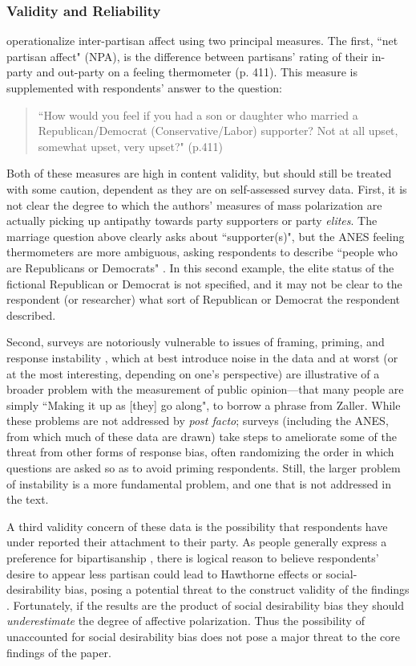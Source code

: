 \documentclass[12pt]{article}
\begin{document}
\subsubsection{Validity and Reliability}
\citeauthor{iyengar2012affect} operationalize inter-partisan affect using two principal measures. The first, ``net partisan affect" (NPA), is the difference between partisans' rating of their in-party and out-party on a feeling thermometer (p. 411). This measure is supplemented with respondents' answer to the question: 
\begin{quote}
``How would you feel if you had a son or daughter who married a Republican/Democrat (Conservative/Labor) supporter? Not at all upset, somewhat upset, very upset?" (p.411)
\end{quote}
Both of these measures are high in content validity, but should still be treated with some caution, dependent as they are on self-assessed survey data. First, it is not clear the degree to which the authors' measures of mass polarization are actually picking up antipathy towards party supporters or party \textit{elites}. The marriage question above clearly asks about ``supporter(s)", but the ANES feeling thermometers are more ambiguous, asking respondents to describe ``people who are Republicans or Democrats" \citep[p. 412]{iyengar2012affect}. In this second example, the elite status of the fictional Republican or Democrat is not specified, and it may not be clear to the respondent (or researcher) what sort of Republican or Democrat the respondent described.

Second, surveys are notoriously vulnerable to issues of framing, priming, and response instability \citep[p. 53--75]{zaller1992nature}, which at best introduce noise in the data and at worst (or at the most interesting, depending on one's perspective) are illustrative of a broader problem with the measurement of public opinion---that many people are simply ``Making it up as [they] go along", to borrow a phrase from Zaller. While these problems are not addressed by \citeauthor{iyengar2012affect} \textit{post facto}; surveys (including the ANES, from which much of these data are drawn) take steps to ameliorate some of the threat from other forms of response bias, often randomizing the order in which questions are asked so as to avoid priming respondents. Still, the larger problem of instability is a more fundamental problem, and one that is not addressed in the text.

A third validity concern of these data is the possibility that respondents have under reported their attachment to their party. As people generally express a preference for bipartisanship \citep{harbridge2014public}, there is logical reason to believe respondents' desire to appear less partisan could lead to Hawthorne effects or social-desirability bias, posing a potential threat to the construct validity of the findings \citep[p. 73, Table 3.1 Item 8]{shadish2002experimental}. Fortunately, if the results are the product of social desirability bias they should \textit{underestimate} the degree of affective polarization. Thus the possibility of unaccounted for social desirability bias does not pose a major threat to the core findings of the paper.
\end{document}

